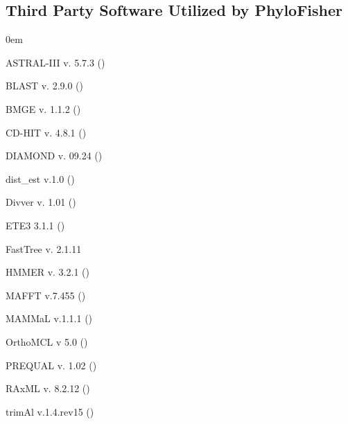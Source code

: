 \documentclass{article}
\begin{document}
        \subsection{Third Party Software Utilized by PhyloFisher}
            \begin{description}
                \itemsep0em
                
                \item ASTRAL-III v. 5.7.3 (\cite{zhang_astral-iii_2018}) 
                \item BLAST v. 2.9.0 (\cite{Altschul1990})
                \item BMGE v. 1.1.2 (\cite{criscuolo_bmge_2010})
                \item CD-HIT v. 4.8.1 (\cite{fu_cd-hit_2012})
                \item DIAMOND v. 09.24 (\cite{buchfink_fast_2015})
                \item dist\_est v.1.0 (\cite{susko_estimation_2003})
                \item Divver v. 1.01 (\cite{ali_identifying_2019})
                \item ETE3 3.1.1 (\cite{Huerta-Cepas})
                \item FastTree v. 2.1.11 \cite{price_fasttree_2010}
                \item HMMER v. 3.2.1 (\cite{mistry_challenges_2013})
                \item MAFFT v.7.455 (\cite{katoh_mafft_2013})
                \item MAMMaL v.1.1.1 (\cite{susko_accelerated_2018})
                \item OrthoMCL v 5.0 (\cite{chen_orthomcl-db_2006})
                \item PREQUAL v. 1.02 (\cite{whelan_prequal_2018})
                \item RAxML v. 8.2.12 (\cite{stamatakis_raxml_2014})
                \item trimAl v.1.4.rev15 (\cite{capella-gutierrez_trimal_2009})
            \end{description}
    \pagebreak
    
\end{document}
